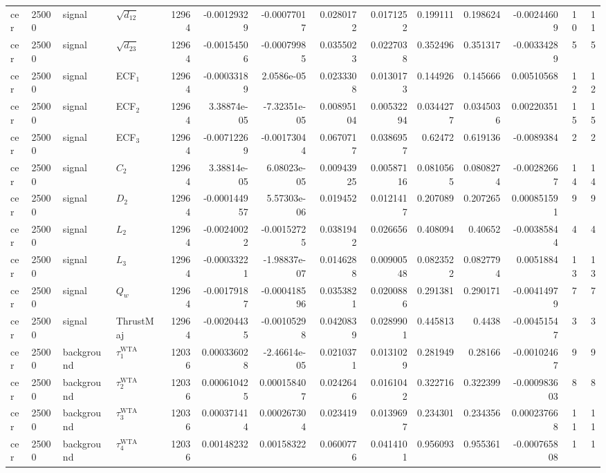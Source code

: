 \begin{landscape}
\begin{longtable}{llll r rrrr rr r rr}
cer & 25000 & signal & $\sqrt{d_{12}}$ & 12964 & -0.00129329 & -0.00077017 & 0.0280172 & 0.0171252 & 0.199111 & 0.198624 & -0.00244609 & 10 & 11 \\
cer & 25000 & signal & $\sqrt{d_{23}}$ & 12964 & -0.00154506 & -0.00079985 & 0.0355023 & 0.0227038 & 0.352496 & 0.351317 & -0.00334289 & 5 & 5 \\
cer & 25000 & signal & ECF$_1$ & 12964 & -0.00033189 & 2.0586e-05 & 0.0233308 & 0.0130173 & 0.144926 & 0.145666 & 0.00510568 & 12 & 12 \\
cer & 25000 & signal & ECF$_2$ & 12964 & 3.38874e-05 & -7.32351e-05 & 0.00895104 & 0.00532294 & 0.0344277 & 0.0345036 & 0.00220351 & 15 & 15 \\
cer & 25000 & signal & ECF$_3$ & 12964 & -0.00712269 & -0.00173044 & 0.0670717 & 0.0386957 & 0.62472 & 0.619136 & -0.0089384 & 2 & 2 \\
cer & 25000 & signal & $C_2$ & 12964 & 3.38814e-05 & 6.08023e-05 & 0.00943925 & 0.00587116 & 0.0810565 & 0.0808274 & -0.00282667 & 14 & 14 \\
cer & 25000 & signal & $D_2$ & 12964 & -0.000144957 & 5.57303e-06 & 0.019452 & 0.0121417 & 0.207089 & 0.207265 & 0.000851591 & 9 & 9 \\
cer & 25000 & signal & $L_2$ & 12964 & -0.00240022 & -0.00152725 & 0.0381942 & 0.026656 & 0.408094 & 0.40652 & -0.00385844 & 4 & 4 \\
cer & 25000 & signal & $L_3$ & 12964 & -0.00033221 & -1.98837e-07 & 0.0146288 & 0.00900548 & 0.0823522 & 0.0827794 & 0.0051884 & 13 & 13 \\
cer & 25000 & signal & $Q_w$ & 12964 & -0.00179187 & -0.000418596 & 0.0353821 & 0.0200886 & 0.291381 & 0.290171 & -0.00414979 & 7 & 7 \\
cer & 25000 & signal & ThrustMaj & 12964 & -0.00204435 & -0.00105298 & 0.0420839 & 0.0289901 & 0.445813 & 0.4438 & -0.00451547 & 3 & 3 \\
cer & 25000 & background & $\tau_1^{\mathrm{WTA}}$ & 12036 & 0.000336028 & -2.46614e-05 & 0.0210371 & 0.0131029 & 0.281949 & 0.28166 & -0.00102467 & 9 & 9 \\
cer & 25000 & background & $\tau_2^{\mathrm{WTA}}$ & 12036 & 0.000610425 & 0.000158407 & 0.0242646 & 0.0161042 & 0.322716 & 0.322399 & -0.000983603 & 8 & 8 \\
cer & 25000 & background & $\tau_3^{\mathrm{WTA}}$ & 12036 & 0.000371414 & 0.000267304 & 0.023419 & 0.0139697 & 0.234301 & 0.234356 & 0.000237668 & 11 & 11 \\
cer & 25000 & background & $\tau_4^{\mathrm{WTA}}$ & 12036 & 0.00148232 & 0.00158322 & 0.0600776 & 0.0414101 & 0.956093 & 0.955361 & -0.000765808 & 1 & 1 \\

\end{longtable}
\end{landscape}
